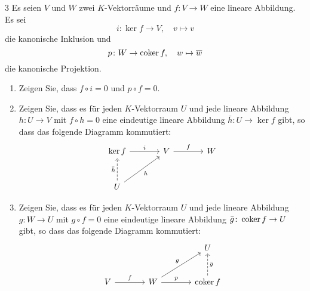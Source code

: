 \begin{question}[subtitle = Die Universelle Eigenschaft des Kerns und des Kokerns]{3}
  Es seien $V$ und $W$ zwei $K$-Vektorräume und $f \colon V \to W$ eine lineare Abbildung.
  Es sei
  \[
    i \colon \ker f \to V,
    \quad
    v \mapsto v
  \]
  die kanonische Inklusion und
  \[
    p \colon W \to \operatorname{coker} f,
    \quad
    w \mapsto \overline{w}
  \]
  die kanonische Projektion.
  \begin{enumerate}[leftmargin=*]
    \item
      Zeigen Sie, dass $f \circ i = 0$ und $p \circ f = 0$.
    \item
      Zeigen Sie, dass es für jeden $K$-Vektorraum $U$ und jede lineare Abbildung $h \colon U \to V$ mit $f \circ h = 0$ eine eindeutige lineare Abbildung $\bar{h} \colon U \to \ker f$ gibt, so dass das folgende Diagramm kommutiert:
      \[
        \begin{tikzcd}[row sep = large, column sep = large, ampersand replacement = \&]
                \ker f  \arrow{r}{i}
            \&  V       \arrow{r}{f}
            \&  W
          \\
                U       \arrow[swap]{ru}{h}
                        \arrow[dashed]{u}{\bar{h}}
            \&  {}
            \&  {}
        \end{tikzcd}
      \]
    \item
      Zeigen Sie, dass es für jeden $K$-Vektorraum $U$ und jede lineare Abbildung $g \colon W \to U$ mit $g \circ f = 0$ eine eindeutige lineare Abbildung $\bar{g} \colon \operatorname{coker} f \to U$ gibt, so dass das folgende Diagramm kommutiert:
      \[
        \begin{tikzcd}[row sep = large, column sep = large, ampersand replacement = \&]
                {}
            \&  {}
            \&  U
          \\
                V         \arrow{r}{f}
            \&  W         \arrow{r}{p}
                          \arrow{ru}{g}
            \&  \coker f  \arrow[swap, dashed]{u}{\bar{g}}
        \end{tikzcd}
      \]
  \end{enumerate}
\end{question}








